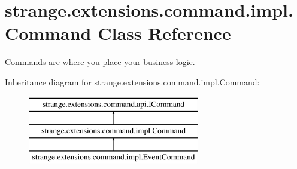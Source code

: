 \hypertarget{classstrange_1_1extensions_1_1command_1_1impl_1_1_command}{\section{strange.\-extensions.\-command.\-impl.\-Command Class Reference}
\label{classstrange_1_1extensions_1_1command_1_1impl_1_1_command}
}


Commands are where you place your business logic.  


Inheritance diagram for strange.\-extensions.\-command.\-impl.\-Command\-:\begin{figure}[H]
\begin{center}
\leavevmode
\includegraphics[height=3.000000cm]{classstrange_1_1extensions_1_1command_1_1impl_1_1_command}
\end{center}
\end{figure}
